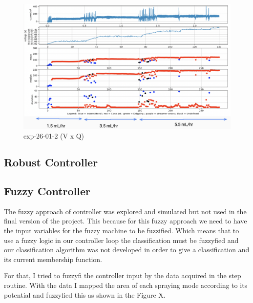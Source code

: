         \begin{figure}[H]
            \center
            \includegraphics[width=15cm]{Figuras/19:03/control_first_results.png}
            \caption{ exp-26-01-2 (V x Q)}
        \end{figure}


    \subsection{Robust Controller}

    \subsection{Fuzzy Controller}

        The fuzzy approach of controller was explored and simulated but not used in the final version of the project.
        This because for this fuzzy approach we need to have the input variables for the fuzzy machine to be fuzzified.
        Which means that to use a fuzzy logic in our controller loop the classification must be fuzzyfied and our classification algorithm was not developed in order to give a classification and its current membership function.

        For that, I tried to fuzzyfi the controller input by the data acquired in the step routine. With the data I mapped the area of each spraying mode according to its potential and fuzzyfied this as shown in the Figure X.

